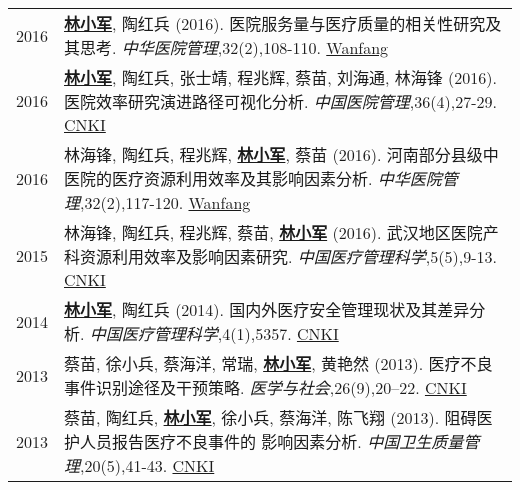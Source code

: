 \documentclass{resume}
\begin{document}
\begin{longtable}{r p{14cm}}
2016 & \underline{\textbf{林小军}}, 陶红兵 (2016). 医院服务量与医疗质量的相关性研究及其思考. \emph{中华医院管理},32(2),108-110. \href{http://www.wanfangdata.com.cn/details/detail.do?_type=perio&id=zhyygl201602010}{Wanfang}\\
2016 & \underline{\textbf{林小军}}, 陶红兵, 张士靖, 程兆辉, 蔡苗, 刘海通, 林海锋 (2016). 医院效率研究演进路径可视化分析. \emph{中国医院管理},36(4),27-29. \href{http://kns.cnki.net/KCMS/detail/detail.aspx?dbcode=CJFQ&dbname=CJFDLAST2016&filename=YYGL201604015&v=MjM5ODRSTEtlWnVadEZpRG5VNy9MUERUTVlyRzRIOWZNcTQ5RVlZUjhlWDFMdXhZUzdEaDFUM3FUcldNMUZyQ1U=}{CNKI}\\
2016 & 林海锋, 陶红兵, 程兆辉, \underline{\textbf{林小军}}, 蔡苗 (2016). 河南部分县级中医院的医疗资源利用效率及其影响因素分析. \emph{中华医院管理},32(2),117-120. \href{http://www.wanfangdata.com.cn/details/detail.do?_type=perio&id=zhyygl201602013}{Wanfang}\\
2015 & 林海锋, 陶红兵, 程兆辉, 蔡苗, \underline{\textbf{林小军}} (2016). 武汉地区医院产科资源利用效率及影响因素研究. \emph{中国医疗管理科学},5(5),9-13. \href{http://kns.cnki.net/KCMS/detail/detail.aspx?dbcode=CJFQ&dbname=CJFDLAST2015&filename=YLGL201505004&v=MjkxODIxTHV4WVM3RGgxVDNxVHJXTTFGckNVUkxLZVp1WnNGaXZtVkx2QVBDSE1Zckc0SDlUTXFvOUZZSVI4ZVg=}{CNKI}\\
2014 & \underline{\textbf{林小军}}, 陶红兵 (2014). 国内外医疗安全管理现状及其差异分析. \emph{中国医疗管理科学},4(1),5357. \href{http://kns.cnki.net/KCMS/detail/detail.aspx?dbcode=CJFQ&dbname=CJFD2014&filename=YLGL201401019&v=MjQzMzVUcldNMUZyQ1VSTEtlWnVadEZpRG5WNy9JUENITVlyRzRIOVhNcm85RWJZUjhlWDFMdXhZUzdEaDFUM3E=}{CNKI}\\
2013 & 蔡苗, 徐小兵, 蔡海洋, 常瑞, \underline{\textbf{林小军}}, 黄艳然 (2013). 医疗不良事件识别途径及干预策略. \emph{医学与社会},26(9),20–22. \href{http://kns.cnki.net/KCMS/detail/detail.aspx?dbcode=CJFQ&dbname=CJFDHIS2&filename=YXSH201309007&v=MDAwNDFyQ1VSTEtlWnVac0Zpdm1XcnZOUERYWVpyRzRIOUxNcG85Rlk0UjhlWDFMdXhZUzdEaDFUM3FUcldNMUY=}{CNKI}\\
2013 & 蔡苗, 陶红兵, \underline{\textbf{林小军}}, 徐小兵, 蔡海洋, 陈飞翔 (2013). 阻碍医护人员报告医疗不良事件的 影响因素分析. \emph{中国卫生质量管理},20(5),41-43. \href{http://kns.cnki.net/KCMS/detail/detail.aspx?dbcode=CJFQ&dbname=CJFDHIS2&filename=WSJG201305024&v=Mjc4MDIxTHV4WVM3RGgxVDNxVHJXTTFGckNVUkxLZVp1WnNGaXZuVXJ6Tk1qN0JhYkc0SDlMTXFvOUhZSVI4ZVg=}{CNKI}\\	
\end{longtable}
\end{document}
